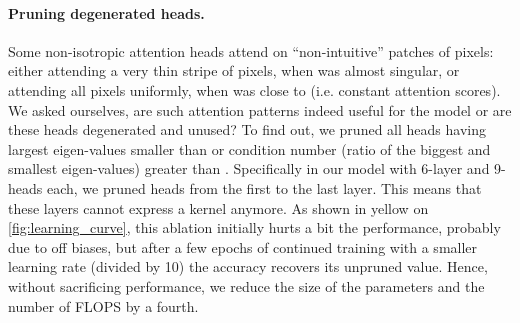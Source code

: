 \documentclass{article} \usepackage{iclr2020_conference,times}
\begin{document}
\paragraph{Pruning degenerated heads.}
Some non-isotropic attention heads attend on ``non-intuitive'' patches of pixels:
either attending a very thin stripe of pixels, when  was almost singular, or attending all pixels uniformly, when  was close to  (i.e. constant attention scores).
We asked ourselves, are such attention patterns indeed useful for the model or are these heads degenerated and unused?
To find out, we pruned all heads having largest eigen-values smaller than  or condition number (ratio of the biggest and smallest eigen-values) greater than .
Specifically in our model with 6-layer and 9-heads each, we pruned  heads from the first to the last layer.
This means that these layers cannot express a  kernel anymore.
As shown in yellow on \cref{fig:learning_curve}, this ablation initially hurts a bit the performance, probably due to off biases, but after a few epochs of continued training with a smaller learning rate (divided by 10) the accuracy recovers its unpruned value.
Hence, without sacrificing performance, we reduce the size of the parameters and the number of FLOPS by a fourth.

\begin{figure}\begin{floatrow}
\end{floatrow}
\end{figure}
\end{document}
